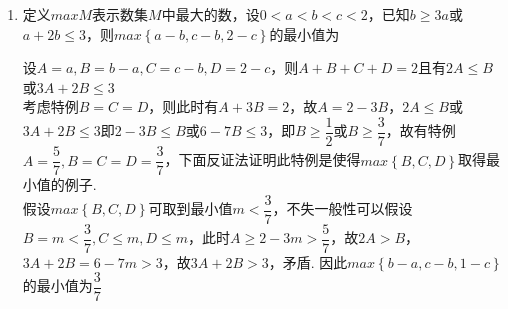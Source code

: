 \begin{enumerate}
\begin{enumerate}
\begin{jieda}
            下面反证法证明此特例是使得$max\left\{B, C, D\right\}$取得最小值的例子.
    
            
            假设$max\left\{B, C, D\right\}$可取到最小值$m < \dfrac{1}{5}$，不失一般性可以假设$B = m < \dfrac{1}{5}, C \leq m, D \leq m$，此时$A \geq 1 - 3m > \dfrac{2}{5}$，故$A > B$，$2A + B = 2 - 5m > 1$，故$2A+B > 1$，矛盾.
            因此$max\left\{b-a, c-b, 1-c\right\}$的最小值为$\dfrac{1}{5}$
        \end{jieda}
        \item 定义$max M$表示数集$M$中最大的数，设$0 < a < b < c < 2$，已知$b \geq 3a$或$a+2b \leq 3$，则$max\left\{a-b, c-b, 2-c\right\}$的最小值为
        \begin{jieda}
            设$A = a, B = b-a, C = c - b, D = 2 - c$，则$A+B+C+D = 2$且有$2A \leq B$或$3A+2B \leq 3$ \\
            考虑特例$B = C = D$，则此时有$A+3B = 2$，故$A = 2-3B$，$2A \leq B$或$3A+2B \leq 3$即$2-3B \leq B$或$6-7B \leq 3$，即$B \geq \dfrac{1}{2}$或$B \geq \dfrac{3}{7}$，故有特例$A = \dfrac{5}{7}, B = C = D = \dfrac{3}{7}$，下面反证法证明此特例是使得$max\left\{B, C, D\right\}$取得最小值的例子. \\
            假设$max\left\{B, C, D\right\}$可取到最小值$m < \dfrac{3}{7}$，不失一般性可以假设$B = m < \dfrac{3}{7}, C \leq m, D \leq m$，此时$A \geq 2 - 3m > \dfrac{5}{7}$，故$2A > B$，$3A + 2B = 6 - 7m > 3$，故$3A+2B > 3$，矛盾.
            因此$max\left\{b-a, c-b, 1-c\right\}$的最小值为$\dfrac{3}{7}$
        \end{jieda}
    \end{enumerate}
\end{enumerate}